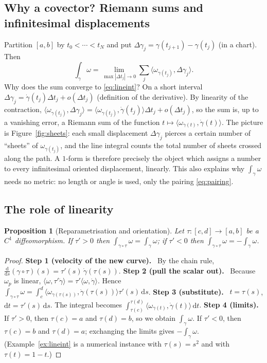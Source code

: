 \documentclass[11pt,a4paper]{article}
\newcounter{thm}[section]
\numberwithin{equation}{section}
\theoremstyle{definition}
\theoremstyle{plain}
\newtheorem{proposition}[thm]{Proposition}
\newcommand{\Step}[2]{\textbf{Step #1 (#2).}\ }
\newcommand{\dd}{\mathrm{d}}
\begin{document}
\subsection{Why a covector? Riemann sums and infinitesimal displacements}\label{sec:riemannsums}

Partition $[a,b]$ by $t_0<\cdots<t_N$ and put $\Delta\gamma_j=\gamma(t_{j+1})-\gamma(t_j)$ (in a chart). Then
\[
\int_\gamma\omega=\lim_{\max|\Delta t_j|\to0}\sum_j\bigl\langle\omega_{\gamma(t_j)},\Delta\gamma_j\bigr\rangle .
\]
Why does the sum converge to \eqref{eq:lineint}? On a short interval $\Delta\gamma_j=\dot\gamma(t_j)\Delta t_j+o(\Delta t_j)$ (definition of the derivative). By linearity of the contraction,
$\langle\omega_{\gamma(t_j)},\Delta\gamma_j\rangle=\langle\omega_{\gamma(t_j)},\dot\gamma(t_j)\rangle\Delta t_j+o(\Delta t_j)$, so the sum is, up to a vanishing error, a Riemann sum of the function $t\mapsto\langle\omega_{\gamma(t)},\dot\gamma(t)\rangle$.
The picture is Figure~\ref{fig:sheets}: each small displacement $\Delta\gamma_j$ pierces a certain number of ``sheets'' of $\omega_{\gamma(t_j)}$, and the line integral counts the total number of sheets crossed along the path. A $1$-form is therefore precisely the object which assigns a number to every infinitesimal oriented displacement, linearly. This also explains why $\int_\gamma\omega$ needs no metric: no length or angle is used, only the pairing \eqref{eq:pairing}.

\subsection{The role of linearity}\label{sec:linearity}

\begin{proposition}[Reparametrisation and orientation]\label{prop:reparam}
Let $\tau:[c,d]\to[a,b]$ be a $C^1$ diffeomorphism. If $\tau'>0$ then $\int_{\gamma\circ\tau}\omega=\int_\gamma\omega$; if $\tau'<0$ then $\int_{\gamma\circ\tau}\omega=-\int_\gamma\omega$.
\end{proposition}
\begin{proof}
\Step{1}{velocity of the new curve} By the chain rule, $\frac{\dd}{\dd s}(\gamma\circ\tau)(s)=\tau'(s)\,\dot\gamma(\tau(s))$.
\Step{2}{pull the scalar out} Because $\omega_p$ is linear, $\langle\omega,\tau'\dot\gamma\rangle=\tau'\langle\omega,\dot\gamma\rangle$. Hence $\int_{\gamma\circ\tau}\omega=\int_c^d\langle\omega_{\gamma(\tau(s))},\dot\gamma(\tau(s))\rangle\tau'(s)\,\dd s$.
\Step{3}{substitute} $t=\tau(s)$, $\dd t=\tau'(s)\,\dd s$. The integral becomes $\int_{\tau(c)}^{\tau(d)}\langle\omega_{\gamma(t)},\dot\gamma(t)\rangle\,\dd t$.
\Step{4}{limits} If $\tau'>0$, then $\tau(c)=a$ and $\tau(d)=b$, so we obtain $\int_\gamma\omega$. If $\tau'<0$, then $\tau(c)=b$ and $\tau(d)=a$; exchanging the limits gives $-\int_\gamma\omega$.
(Example~\ref{ex:lineint} is a numerical instance with $\tau(s)=s^2$ and with $\tau(t)=1-t$.)
\end{proof}
\end{document}
